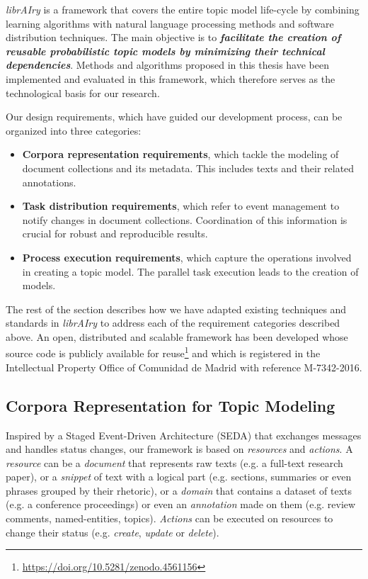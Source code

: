 \textit{librAIry} is a framework that covers the entire topic model life-cycle by combining learning algorithms with natural language processing methods and software distribution techniques. The main objective is to \textbf{\textit{facilitate the creation of reusable probabilistic topic models by minimizing their technical dependencies}}. Methods and algorithms proposed in this thesis have been implemented and evaluated in this framework, which therefore serves as the technological basis for our research.

Our design requirements, which have guided our development process, can be organized into three categories:
\begin{itemize}
\item \textbf{Corpora representation requirements}, which tackle the modeling of document collections and its metadata. This includes texts and their related annotations.
\item \textbf{Task distribution requirements}, which refer to event management to notify changes in document collections. Coordination of this information is crucial for robust and reproducible results.  
\item \textbf{Process execution requirements}, which capture the operations involved in creating a topic model. The parallel task execution leads to the creation of models.
\end{itemize}

The rest of the section describes how we have adapted existing techniques and standards in \textit{librAIry} to address each of the requirement categories described above. An open, distributed and scalable framework has been developed whose source code is publicly available for reuse\footnote{\url{https://doi.org/10.5281/zenodo.4561156}} and which is registered in the Intellectual Property Office of Comunidad de Madrid with reference M-7342-2016.

\subsection{Corpora Representation for Topic Modeling}
\label{sec:representing-corpora}

Inspired by a Staged Event-Driven Architecture (SEDA) that exchanges messages and handles status changes, our framework is based on \textit{resources} and \textit{actions}. A \textit{resource} can be a \textit{document} that represents raw texts (e.g. a full-text research paper), or a \textit{snippet} of text with a logical part  (e.g. sections, summaries or even phrases grouped by their rhetoric), or a \textit{domain} that contains a dataset of texts (e.g. a conference proceedings) or even an \textit{annotation} made on them (e.g. review comments, named-entities, topics). \textit{Actions} can be executed on resources to change their status (e.g. \textit{create}, \textit{update} or \textit{delete}).

